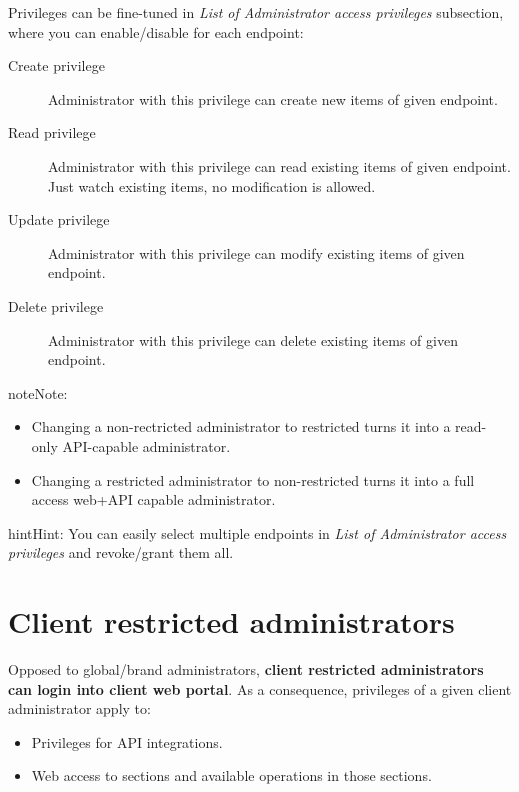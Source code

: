 \documentclass[letterpaper,10pt,english]{sphinxmanual}
\begin{document}
Privileges can be fine-tuned in \emph{List of Administrator access privileges} subsection, where you can enable/disable
for each endpoint:
\begin{description}
\item[{Create privilege}] \leavevmode{}\label{api_rest/acls:term-create-privilege}
Administrator with this privilege can create new items of given endpoint.

\item[{Read privilege}] \leavevmode{}\label{api_rest/acls:term-read-privilege}
Administrator with this privilege can read existing items of given endpoint. Just watch existing items, no
modification is allowed.

\item[{Update privilege}] \leavevmode{}\label{api_rest/acls:term-update-privilege}
Administrator with this privilege can modify existing items of given endpoint.

\item[{Delete privilege}] \leavevmode{}\label{api_rest/acls:term-delete-privilege}
Administrator with this privilege can delete existing items of given endpoint.

\end{description}

\begin{notice}{note}{Note:}\begin{itemize}
\item {} 
Changing a non-rectricted administrator to restricted turns it into a read-only API-capable administrator.

\item {} 
Changing a restricted administrator to non-restricted turns it into a full access web+API capable administrator.

\end{itemize}
\end{notice}

\begin{notice}{hint}{Hint:}
You can easily select multiple endpoints in \emph{List of Administrator access privileges} and revoke/grant them all.
\end{notice}


\section{Client restricted administrators}
\label{api_rest/acls:client-restricted-administrators}
Opposed to global/brand administrators, \textbf{client restricted administrators can login into client web portal}. As a
consequence, privileges of a given client administrator apply to:
\begin{itemize}
\item {} 
Privileges for API integrations.

\item {} 
Web access to sections and available operations in those sections.

\end{itemize}
\end{document}
